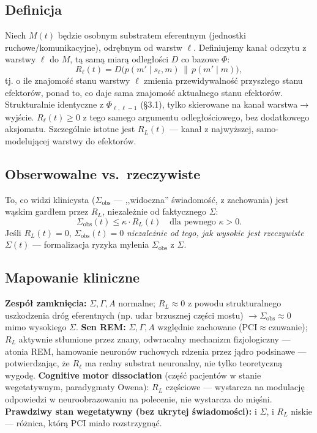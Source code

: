 \documentclass[11pt]{article}
\begin{document}
\subsection*{Definicja}
Niech $M(t)$ będzie osobnym substratem eferentnym (jednostki ruchowe/komunikacyjne), odrębnym od warstw $\ell$. Definiujemy kanał odczytu z warstwy $\ell$ do $M$, tą samą miarą odległości $D$ co bazowe $\Phi$:
\[
R_\ell(t) = D\big(p(m'\mid s_\ell,m)\,\|\,p(m'\mid m)\big),
\]
tj. o ile znajomość stanu warstwy $\ell$ zmienia przewidywalność przyszłego stanu efektorów, ponad to, co daje sama znajomość aktualnego stanu efektorów. Strukturalnie identyczne z $\Phi_{\ell,\ell-1}$ (\S3.1), tylko skierowane na kanał warstwa$\to$wyjście. $R_\ell(t)\ge0$ z tego samego argumentu odległościowego, bez dodatkowego aksjomatu. Szczególnie istotne jest $R_L(t)$ --- kanał z najwyższej, samo-modelującej warstwy do efektorów.

\subsection*{Obserwowalne vs.\ rzeczywiste}
To, co widzi klinicysta ($\Sigma_{\text{obs}}$ --- ,,widoczna'' świadomość, z zachowania) jest wąskim gardłem przez $R_L$, niezależnie od faktycznego $\Sigma$:
\[
\Sigma_{\text{obs}}(t) \le \kappa\cdot R_L(t) \quad \text{dla pewnego } \kappa>0.
\]
Jeśli $R_L(t)=0$, $\Sigma_{\text{obs}}(t)=0$ \emph{niezależnie od tego, jak wysokie jest rzeczywiste $\Sigma(t)$} --- formalizacja ryzyka mylenia $\Sigma_{\text{obs}}$ z $\Sigma$.

\subsection*{Mapowanie kliniczne}
\textbf{Zespół zamknięcia:} $\Sigma,\Gamma,A$ normalne; $R_L\approx0$ z powodu strukturalnego uszkodzenia dróg eferentnych (np. udar brzusznej części mostu) $\to\Sigma_{\text{obs}}\approx0$ mimo wysokiego $\Sigma$. \textbf{Sen REM:} $\Sigma,\Gamma,A$ względnie zachowane (PCI$\approx$czuwanie); $R_L$ aktywnie stłumione przez znany, odwracalny mechanizm fizjologiczny --- atonia REM, hamowanie neuronów ruchowych rdzenia przez jądro podsinawe --- potwierdzając, że $R_\ell$ ma realny substrat neuronalny, nie tylko teoretyczną wygodę. \textbf{Cognitive motor dissociation} (część pacjentów w stanie wegetatywnym, paradygmaty Owena): $R_L$ częściowe --- wystarcza na modulację odpowiedzi w neuroobrazowaniu na polecenie, nie wystarcza do mięśni. \textbf{Prawdziwy stan wegetatywny (bez ukrytej świadomości):} i $\Sigma$, i $R_L$ niskie --- różnica, którą PCI miało rozstrzygnąć.
\end{document}
